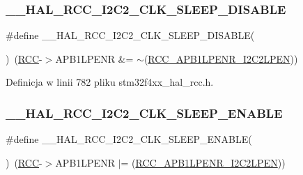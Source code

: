 \subsubsection{\texorpdfstring{\+\_\+\+\_\+\+H\+A\+L\+\_\+\+R\+C\+C\+\_\+\+I2\+C2\+\_\+\+C\+L\+K\+\_\+\+S\+L\+E\+E\+P\+\_\+\+D\+I\+S\+A\+B\+LE}{\_\_HAL\_RCC\_I2C2\_CLK\_SLEEP\_DISABLE}}
{\footnotesize\ttfamily \#define \+\_\+\+\_\+\+H\+A\+L\+\_\+\+R\+C\+C\+\_\+\+I2\+C2\+\_\+\+C\+L\+K\+\_\+\+S\+L\+E\+E\+P\+\_\+\+D\+I\+S\+A\+B\+LE(\begin{DoxyParamCaption}{ }\end{DoxyParamCaption})~(\hyperlink{group___peripheral__declaration_ga74944438a086975793d26ae48d5882d4}{R\+CC}-\/$>$A\+P\+B1\+L\+P\+E\+NR \&= $\sim$(\hyperlink{group___peripheral___registers___bits___definition_gaf6a53d37df11a56412ae06f73626f637}{R\+C\+C\+\_\+\+A\+P\+B1\+L\+P\+E\+N\+R\+\_\+\+I2\+C2\+L\+P\+EN}))}



Definicja w linii 782 pliku stm32f4xx\+\_\+hal\+\_\+rcc.\+h.

\mbox{\label{group___r_c_c___a_p_b1___low_power___enable___disable_gac0167c77fa1c00add900bb1cf788e68c}} 
\subsubsection{\texorpdfstring{\+\_\+\+\_\+\+H\+A\+L\+\_\+\+R\+C\+C\+\_\+\+I2\+C2\+\_\+\+C\+L\+K\+\_\+\+S\+L\+E\+E\+P\+\_\+\+E\+N\+A\+B\+LE}{\_\_HAL\_RCC\_I2C2\_CLK\_SLEEP\_ENABLE}}
{\footnotesize\ttfamily \#define \+\_\+\+\_\+\+H\+A\+L\+\_\+\+R\+C\+C\+\_\+\+I2\+C2\+\_\+\+C\+L\+K\+\_\+\+S\+L\+E\+E\+P\+\_\+\+E\+N\+A\+B\+LE(\begin{DoxyParamCaption}{ }\end{DoxyParamCaption})~(\hyperlink{group___peripheral__declaration_ga74944438a086975793d26ae48d5882d4}{R\+CC}-\/$>$A\+P\+B1\+L\+P\+E\+NR $\vert$= (\hyperlink{group___peripheral___registers___bits___definition_gaf6a53d37df11a56412ae06f73626f637}{R\+C\+C\+\_\+\+A\+P\+B1\+L\+P\+E\+N\+R\+\_\+\+I2\+C2\+L\+P\+EN}))}



